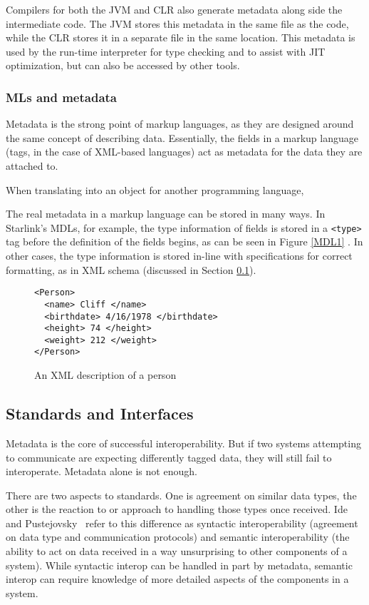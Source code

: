 \documentclass{sig-alternate}
\begin{document}
Compilers for both the JVM and CLR also generate metadata along side the intermediate code. The JVM stores this metadata in the same file as the code, while the CLR stores it in a separate file in the same location. This metadata is used by the run-time interpreter for type checking and to assist with JIT optimization, but can also be accessed by other tools. 

\subsubsection*{MLs and metadata}
Metadata is the strong point of markup languages, as they are designed around the same concept of describing data. Essentially, the fields in a markup language (tags, in the case of XML-based languages) act as metadata for the data they are attached to.

When translating into an object for another programming language, 

The real metadata in a markup language can be stored in many ways. In Starlink's MDLs, for example, the type information of fields is stored in a {\tt <type>} tag before the definition of the fields begins, as can be seen in Figure \ref{MDL1} \cite{Bromberg:2011}. In other cases, the type information is stored in-line with specifications for correct formatting, as in XML schema (discussed in Section \ref{standards}).


\begin{figure}
\begin{verbatim}
<Person>
  <name> Cliff </name>
  <birthdate> 4/16/1978 </birthdate>
  <height> 74 </height>
  <weight> 212 </weight>
</Person>
\end{verbatim}
\caption{An XML description of a person}
\label{XMLexample}
\end{figure}

\subsection{Standards and Interfaces}\label{standards}
Metadata is the core of successful interoperability. But if two systems attempting to communicate are expecting differently tagged data, they will still fail to interoperate. Metadata alone is not enough.

There are two aspects to standards. One is agreement on similar data types, the other is the reaction to or approach to handling those types once received. Ide and Pustejovsky~\cite{Ide:2010} refer to this difference as syntactic interoperability (agreement on data type and communication protocols) and semantic interoperability (the ability to act on data received in a way unsurprising to other components of a system). While syntactic interop can be handled in part by metadata, semantic interop can require knowledge of more detailed aspects of the components in a system.
\end{document}
